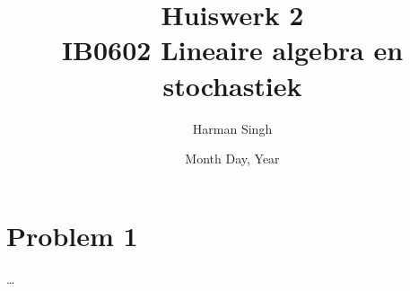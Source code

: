 \documentclass[11pt, a4paper]{article}
\title{Huiswerk 2 \\ IB0602 Lineaire algebra en stochastiek}
\author{Harman Singh}
\date{Month Day, Year}
\begin{document}
\maketitle

\pagebreak
\section*{Problem 1}





\ldots
\end{document}
